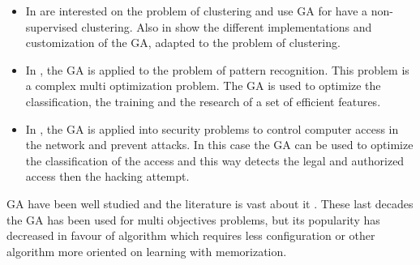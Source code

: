 
\begin{itemize}

\item In \cite{117*sheikh2008} are interested on the problem of clustering and use GA for have a non-supervised clustering. Also in  \cite{117*sheikh2008} show the different implementations and customization of the GA, adapted to the  problem of clustering.
\item In \cite{122*wang1996}, the GA is applied to the problem of pattern recognition. This problem is a complex multi optimization problem. The GA is used to optimize the classification, the training and the research of a set of efficient features. 
\item In \cite{ 123*owais2008}, the GA is applied into security problems to control computer access in the network and prevent attacks. In this case the GA can be used to optimize the classification of the access and this way detects the legal and authorized access then the hacking attempt.   
 
\end{itemize}

GA have been well studied  and the literature is vast about it . These last decades the GA  has been used for multi objectives problems, but its popularity has decreased in favour of algorithm which requires less configuration or other algorithm  more oriented on learning with memorization.  

